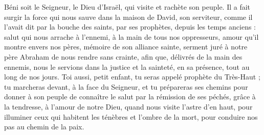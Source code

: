 Béni soit le Seigneur, le Dieu d’Israël, qui visite et rachète son peuple.
\versseparator
Il a fait surgir la force qui nous sauve dans la maison de David, son serviteur,
\versseparator
comme il l’avait dit par la bouche des saints, par ses prophètes, depuis les temps anciens :
\versseparator
salut qui nous arrache à l’ennemi, à la main de tous nos oppresseurs,
\versseparator
amour qu’il montre envers nos pères, mémoire de son alliance sainte,
\versseparator
serment juré à notre père Abraham de nous rendre sans crainte,
\versseparator
afin que, délivrés de la main des ennemis,
\versseparator
nous le servions dans la justice et la sainteté, en sa présence, tout au long de nos jours.
\versseparator
Toi aussi, petit enfant, tu seras appelé prophète du Très-Haut ; tu marcheras devant, à la face du Seigneur, et tu prépareras ses chemins
\versseparator
pour donner à son peuple de connaître le salut par la rémission de ses péchés,
\versseparator
grâce à la tendresse, à l’amour de notre Dieu, quand nous visite l’astre d’en haut,
\versseparator
pour illuminer ceux qui habitent les ténèbres et l’ombre de la mort, pour conduire nos pas au chemin de la paix.
